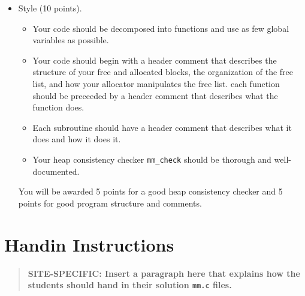 \documentclass[11pt]{article}
\newcommand{\comment}[1]{}
\begin{document}
\begin{itemize}
\item {Style (10 points).}
\begin{itemize}
\item 
Your code should be decomposed into functions and use 
as few global variables as possible.
\item 
Your code should begin with a header comment that describes the
structure of your free and allocated blocks, the organization of the
free list, and how your allocator manipulates the free list.  each
function should be preceeded by a header comment that describes what
the function does.
\item 
Each subroutine should have a header comment that describes
what it does and how it does it.
\item 
Your heap consistency checker {\tt mm\_check} should be
thorough and well-documented.
\end{itemize}
You will be awarded 5 points for a good heap consistency checker
and 5 points for good program structure and comments.
\end{itemize}

\section{Handin Instructions}

\begin{quote}
\bf SITE-SPECIFIC: Insert a paragraph here that explains how the students
should hand in their solution {\tt mm.c} files.
\end{quote}

\comment{
You will handin your {\tt mm.c} file via a web interface.  See the lab
webpage for details on how to do this.

You may submit your solution for testing as many times as you wish
up until the due date.  The web page will list both your best scoring
submission and your most recent submission.

When you are satisfied with your solution, then you can offically hand
it in.  Only the last version you submit will be graded.

When testing your files locally, make sure to use one of the fish
machines. This will insure that the grade you get from {\tt mdriver}
is representative of the grade you will receive when you submit your
solution.
}
\end{document}
